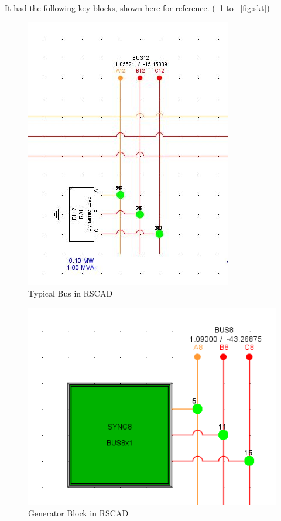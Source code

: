 It had the following key blocks, shown here for reference. (~\ref{fig:bus} to ~\ref{fig:skt})

\begin{figure}[h]
\includegraphics[width=\textwidth]{Figures/bus.jpg}
\caption{Typical Bus in RSCAD}\label{fig:bus}
\end{figure}

\begin{figure}[h]
\includegraphics[width=\textwidth]{Figures/gen.png}
\caption{Generator Block in RSCAD}\label{fig:gen}
\end{figure}

